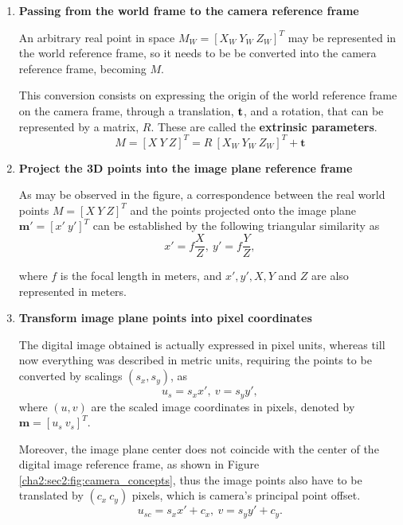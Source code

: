 \begin{enumerate}
	\item \textbf{Passing from the world frame to the camera reference frame}
	
	An arbitrary real point in space $M_W = [X_W \ Y_W \ Z_W]^T$ may be represented in the world reference frame, so it needs to be be converted into the camera reference frame, becoming $M$.
	
	This conversion consists on expressing the origin of the world reference frame on the camera frame, through a translation, $\bf t$, and a rotation, that can be represented by a matrix, $R$. These are called the \textbf{extrinsic parameters}.
	\begin{equation}
		M = [X \ Y \ Z]^T = R \ [X_W \ Y_W \ Z_W]^T + \mathbf{t}
	\end{equation}
	
	\item \textbf{Project the 3D points into the image plane reference frame}
	
	As may be observed in the figure, a correspondence between the real world points $M = [X \ Y \ Z]^T$ and the points projected onto the image plane $\mathbf{m'} = [x' \ y']^T$ can be established by the following triangular similarity as
	\begin{equation}
	\label{cha2:sec2:eq:trisimilar}
	x' = f\frac{X}{Z}, \ y' = f\frac{Y}{Z},
	\end{equation}
	
	where $f$ is the focal length in meters, and $x', y', X ,Y$ and $Z$ are also represented in meters.	
	
	\item \textbf{Transform image plane points into pixel coordinates}
	
	The digital image obtained is actually expressed in pixel units, whereas till now everything was described in metric units, requiring the points to be converted by scalings $(s_x, s_y)$, as 
	\begin{equation}
	\label{cha2:sec2:eq:trisimilar}
	u_s = s_x x', \ v = s_y y',
	\end{equation}
	where $(u,v)$ are the scaled image coordinates in pixels, denoted by $\mathbf{m} = [u_s \ v_s]^T$.
	
	Moreover, the image plane center does not coincide with the center of the digital image reference frame, as shown in Figure \ref{cha2:sec2:fig:camera_concepts}, thus the image points also have to be translated by $(c_x \ c_y)$ pixels, which is camera's principal point offset. 
	\begin{equation}
	\label{cha2:sec2:eq:trisimilar}
	u_{sc} = s_x x' + c_x, \ v = s_y y' + c_y.
	\end{equation}
	

\end{enumerate}
